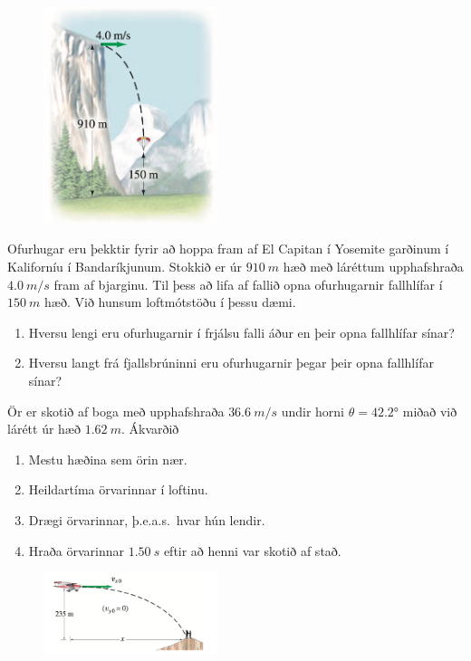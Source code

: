 \begin{enumerate}[label = \textbf{Dæmi \thechapter.\arabic*.}]
\begin{minipage}{\linewidth}
\begin{figure}
\vspace{-1.4cm}
\includegraphics[width=2in]{images/hoppa.png}

\end{figure}

\item Ofurhugar eru þekktir fyrir að hoppa fram af El Capitan í Yosemite garðinum í Kaliforníu í Bandaríkjunum. Stokkið er úr $\SI{910}{m}$ hæð með láréttum upphafshraða $\SI{4.0}{m/s}$ fram af bjarginu. Til þess að lifa af fallið opna ofurhugarnir fallhlífar í $\SI{150}{m}$ hæð. Við hunsum loftmótstöðu í þessu dæmi.

\begin{enumerate}[label = \textbf{(\alph*)}]
    \item Hversu lengi eru ofurhugarnir í frjálsu falli áður en þeir opna fallhlífar sínar?
    \item Hversu langt frá fjallsbrúninni eru ofurhugarnir þegar þeir opna fallhlífar sínar?
\end{enumerate}

\item Ör er skotið af boga með upphafshraða $\SI{36.6}{m/s}$ undir horni $\theta = \ang{42.2}$ miðað við lárétt úr hæð $\SI{1.62}{m}$. Ákvarðið
\begin{enumerate}[label = \textbf{(\alph*)}]
    \item Mestu hæðina sem örin nær.
    \item Heildartíma örvarinnar í loftinu.
    \item Drægi örvarinnar, þ.e.a.s.~hvar hún lendir.
    \item Hraða örvarinnar $\SI{1.50}{s}$ eftir að henni var skotið af stað.
\end{enumerate}

\end{minipage}

\begin{minipage}{\linewidth}
\begin{figure}
\vspace{-3.75cm}
\includegraphics[width=2in]{images/flug.png}
\end{figure}


\end{minipage}
\end{enumerate}
